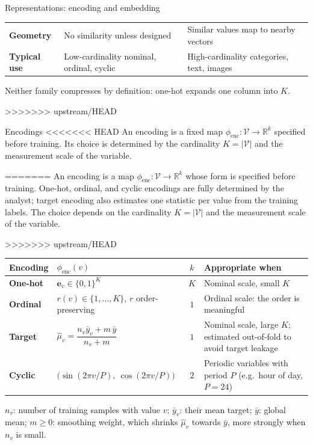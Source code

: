\begin{frame}{Representations: encoding and embedding}
\begin{tabularx}{\textwidth}{>{\bfseries}l >{\raggedright\arraybackslash}X >{\raggedright\arraybackslash}X}
\addlinespace[0.3em]
Geometry & No similarity unless designed & Similar values map to nearby vectors \\
\addlinespace[0.3em]
Typical use & Low-cardinality nominal, ordinal, cyclic & High-cardinality categories, text, images \\
\bottomrule
\end{tabularx}
\par\endgroup
\vspace{0.6em}
{\footnotesize Neither family compresses by definition: one-hot expands one column into $K$.\par}
>>>>>>> upstream/HEAD
\coursefooter
\end{frame}

\begin{frame}{Encodings}
\begingroup\small
<<<<<<< HEAD
An encoding is a fixed map $\phi_{\mathrm{enc}}: \mathcal{V} \to \mathbb{R}^{k}$ specified before training. Its choice is determined by the cardinality $K = |\mathcal{V}|$ and the measurement scale of the variable.
\par\endgroup
\vspace{0.5em}
=======
An encoding is a map $\phi_{\mathrm{enc}}: \mathcal{V} \to \mathbb{R}^{k}$ whose form is specified before training. One-hot, ordinal, and cyclic encodings are fully determined by the analyst; target encoding also estimates one statistic per value from the training labels. The choice depends on the cardinality $K = |\mathcal{V}|$ and the measurement scale of the variable.
\par\endgroup
\vspace{0.4em}
>>>>>>> upstream/HEAD
\begingroup\footnotesize
\renewcommand{\arraystretch}{1.5}
\begin{tabularx}{\textwidth}{>{\bfseries}l l c >{\raggedright\arraybackslash}X}
Encoding & $\phi_{\mathrm{enc}}(v)$ & $k$ & Appropriate when \\
\toprule
One-hot & $\mathbf{e}_v \in \{0,1\}^{K}$ & $K$ & Nominal scale, small $K$ \\
Ordinal & $r(v) \in \{1, \dots, K\}$, $r$ order-preserving & $1$ & Ordinal scale: the order is meaningful \\
Target & $\hat{\mu}_v = \dfrac{n_v \bar{y}_v + m\,\bar{y}}{n_v + m}$ & $1$ & Nominal scale, large $K$; estimated out-of-fold to avoid target leakage \\
Cyclic & $\big(\sin(2\pi v/P),\ \cos(2\pi v/P)\big)$ & $2$ & Periodic variables with period $P$ (e.g.\ hour of day, $P = 24$) \\
\bottomrule
\end{tabularx}
\par\endgroup
\vspace{0.4em}
{\scriptsize $n_v$: number of training samples with value $v$; $\bar{y}_v$: their mean target; $\bar{y}$: global mean; $m \ge 0$: smoothing weight, which shrinks $\hat{\mu}_v$ towards $\bar{y}$, more strongly when $n_v$ is small.\par}
\coursefooter
\end{frame}

